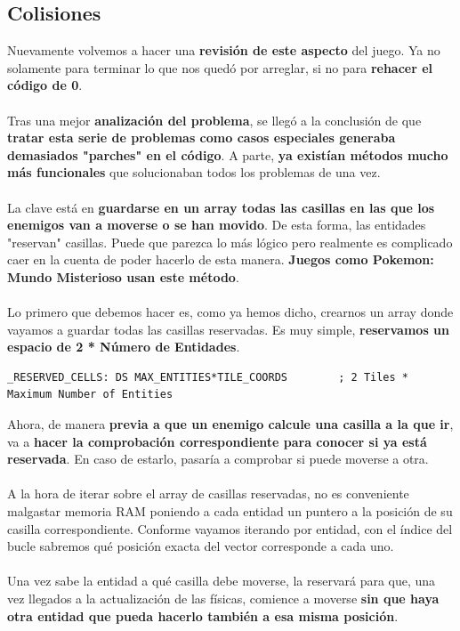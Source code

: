 \subsection{Colisiones}

Nuevamente volvemos a hacer una \textbf{revisión de este aspecto} del juego. Ya no solamente para terminar lo que nos quedó por arreglar, si no para \textbf{rehacer el código de 0}.
\\ \\
Tras una mejor \textbf{analización del problema}, se llegó a la conclusión de que \textbf{tratar esta serie de problemas como casos especiales generaba demasiados "parches" en el código}. A parte, \textbf{ya existían métodos mucho más funcionales} que solucionaban todos los problemas de una vez.
\\ \\
La clave está en \textbf{guardarse en un array todas las casillas en las que los enemigos van a moverse o se han movido}. De esta forma, las entidades "reservan" casillas. Puede que parezca lo más lógico pero realmente es complicado caer en la cuenta de poder hacerlo de esta manera. \textbf{Juegos como \textbf{Pokemon: Mundo Misterioso} usan este método}.
\\ \\
Lo primero que debemos hacer es, como ya hemos dicho, crearnos un array donde vayamos a guardar todas las casillas reservadas. Es muy simple, \textbf{reservamos un espacio de 2 * Número de Entidades}.

\begin{lstlisting}[caption={Definición de Espacio para la Reserva de Casillas}, label={code:savetiles}]
_RESERVED_CELLS: DS MAX_ENTITIES*TILE_COORDS		; 2 Tiles * Maximum Number of Entities
\end{lstlisting}

Ahora, de manera \textbf{previa a que un enemigo calcule una casilla a la que ir}, va a \textbf{hacer la comprobación correspondiente para conocer si ya está reservada}. En caso de estarlo, pasaría a comprobar si puede moverse a otra.
\\ \\
A la hora de iterar sobre el array de casillas reservadas, no es conveniente malgastar memoria RAM poniendo a cada entidad un puntero a la posición de su casilla correspondiente.  Conforme vayamos iterando por entidad, con el índice del bucle sabremos qué posición exacta del vector corresponde a cada uno.
\\ \\
Una vez sabe la entidad a qué casilla debe moverse, la reservará para que, una vez llegados a la actualización de las físicas, comience a moverse \textbf{sin que haya otra entidad que pueda hacerlo también a esa misma posición}.

